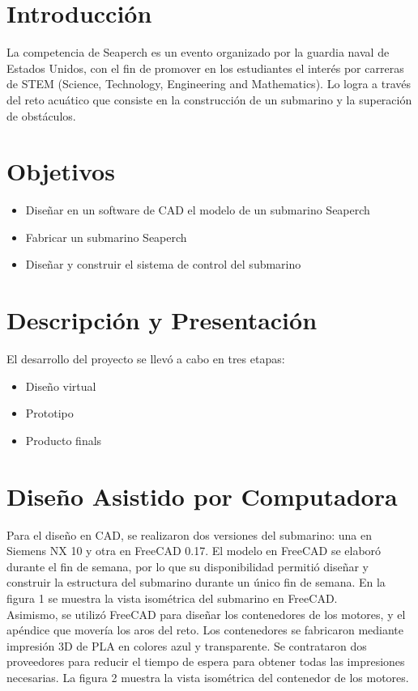 \section{Introducci\'on}
La competencia de Seaperch es un evento organizado por la guardia naval de Estados Unidos, con el fin
de promover en los estudiantes el inter\'es por carreras de STEM (Science, Technology, Engineering and Mathematics).
Lo logra a trav\'es del reto acu\'atico que consiste en la construcci\'on de un submarino y la superaci\'on de obst\'aculos.

\section{Objetivos}
\begin{itemize}
 \item Dise\~nar en un software de CAD el modelo de un submarino Seaperch
 \item Fabricar un submarino Seaperch
 \item Dise\~nar y construir el sistema de control del submarino
\end{itemize}

\section{Descripci\'on y Presentaci\'on}
El desarrollo del proyecto se llev\'o a cabo en tres etapas:
\begin{itemize}
 \item Dise\~no virtual
 \item Prototipo
 \item Producto finals
\end{itemize}

\section{Dise\~no Asistido por Computadora}
Para el dise\~no en CAD, se realizaron dos versiones del submarino: una en Siemens NX 10 y otra en FreeCAD 0.17.
El modelo en FreeCAD se elabor\'o durante el fin de semana, por lo que su disponibilidad permiti\'o dise\~nar y construir
la estructura del submarino durante un \'unico fin de semana. En la figura 1 se muestra la vista isom\'etrica del
submarino en FreeCAD.\\

Asimismo, se utiliz\'o FreeCAD para dise\~nar los contenedores de los motores, y el ap\'endice que mover\'ia los aros del reto.
Los contenedores se fabricaron mediante impresi\'on 3D de PLA en colores azul y transparente. Se contrataron dos proveedores
para reducir el tiempo de espera para obtener todas las impresiones necesarias. La figura 2 muestra la vista
isom\'etrica del contenedor de los motores.\\

